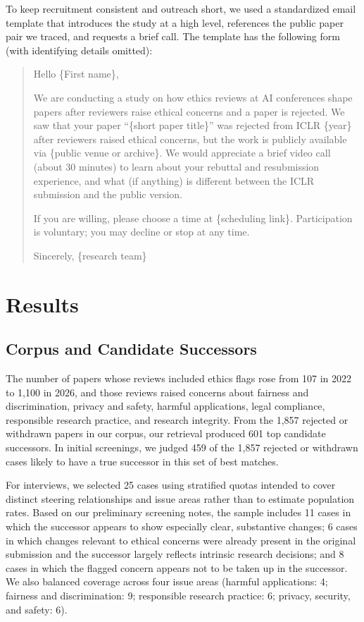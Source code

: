\documentclass[sigconf,nonacm]{acmart} %
\begin{document}
To keep recruitment consistent and outreach short, we used a standardized email template that introduces the study at a high level, references the public paper pair we traced, and requests a brief call. The template has the following form (with identifying details omitted):
\begin{quote}
\small
Hello \{First name\},

We are conducting a study on how ethics reviews at AI conferences shape papers after reviewers raise ethical concerns and a paper is rejected. We saw that your paper ``\{short paper title\}'' was rejected from ICLR \{year\} after reviewers raised ethical concerns, but the work is publicly available via \{public venue or archive\}. We would appreciate a brief video call (about 30 minutes) to learn about your rebuttal and resubmission experience, and what (if anything) is different between the ICLR submission and the public version.

If you are willing, please choose a time at \{scheduling link\}. Participation is voluntary; you may decline or stop at any time.

Sincerely, \{research team\}
\end{quote}

\section{Results}

\subsection{Corpus and Candidate Successors}

The number of papers whose reviews included ethics flags rose from 107 in 2022 to 1,100 in 2026, and those reviews raised concerns about fairness and discrimination, privacy and safety, harmful applications, legal compliance, responsible research practice, and research integrity. From the 1,857 rejected or withdrawn papers in our corpus, our retrieval produced 601 top candidate successors. In initial screenings, we judged 459 of the 1,857 rejected or withdrawn cases likely to have a true successor in this set of best matches.

For interviews, we selected 25 cases using stratified quotas intended to cover distinct steering relationships and issue areas rather than to estimate population rates. Based on our preliminary screening notes, the sample includes 11 cases in which the successor appears to show especially clear, substantive changes; 6 cases in which changes relevant to ethical concerns were already present in the original submission and the successor largely reflects intrinsic research decisions; and 8 cases in which the flagged concern appears not to be taken up in the successor. We also balanced coverage across four issue areas (harmful applications: 4; fairness and discrimination: 9; responsible research practice: 6; privacy, security, and safety: 6).
\end{document}
